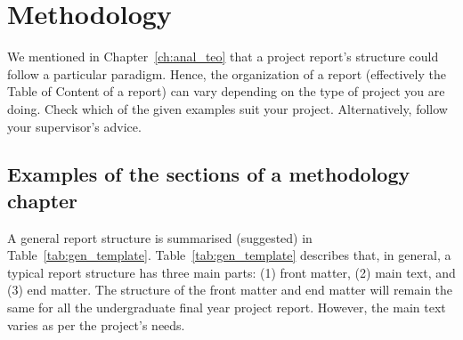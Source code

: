 \chapter{Methodology}
\label{ch:method} %

We mentioned in Chapter~\ref{ch:anal_teo} %
that a project report's structure could follow a particular paradigm. Hence, the organization of a report (effectively the Table of Content of a report) can vary depending on the type of project you are doing. Check which of the given examples suit your project. Alternatively, follow your supervisor's advice.

\section{Examples of the sections of a methodology chapter}
A general report structure is summarised (suggested) in Table~\ref{tab:gen_template}. Table~\ref{tab:gen_template} describes that, in general, a typical report structure has three main parts: (1) front matter, (2) main text, and (3) end matter. %
The structure of the front matter and end matter will remain the same for all the undergraduate final year project report. However, the main text varies as per the project's needs.
